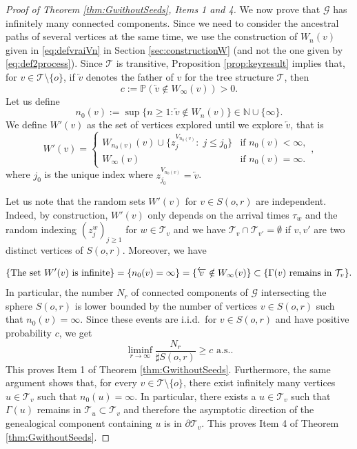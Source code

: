 \documentclass[french]{article}
\newcommand{\zi}{z}
\newcommand{\N}{\mathbb{N}}
\renewcommand{\P}{\mathbb{P}}
\newcommand{\T}{\mathcal{T}}
\renewcommand{\1}{\mathds{1}}
\begin{document}
\begin{proof}[Proof of Theorem \ref{thm:GwithoutSeeds}, Items 1 and 4]
We now prove that $\mathcal{G}$ has infinitely many connected components. Since we need to consider the ancestral paths of several vertices at the same time, we use the construction of $W_n(v)$ given in \eqref{eq:defvraiVn} in Section \ref{sec:constructionW} (and not the one given by \eqref{eq:def2process}). Since $\T$ is transitive, Proposition \ref{prop:keyresult} implies that, for $v \in \T \setminus \{o\}$, if $\overleftarrow{v}$ denotes the father of $v$ for the tree structure $\T$, then
$$c := \P(\overleftarrow{v}\notin W_\infty(v)) >0.$$
Let us define 
$$n_0(v) := \sup\{n\ge 1: \overleftarrow{v}\notin W_n(v)\} \in \N \cup \{\infty\}.$$
We define $W'(v)$ as the set of vertices explored until we explore $\overleftarrow{v}$, that is
\[
W'(v) =
\begin{cases}
W_{n_0(v)}(v)\cup\{\zi_{j}^{V_{n_0(v)}}:\; j\le j_0\} & \text{if } n_0(v)<\infty,\\
W_\infty(v) & \text{if } n_0(v)=\infty.
\end{cases},
\]
where $j_0$ is the unique index where $\zi_{j_0}^{V_{n_0(v)}} = \overleftarrow{v}$. 



Let us note that the random sets $W'(v)$ for $v\in S(o,r)$ are independent. Indeed, by construction, $W'(v)$ only depends on the arrival times $\tau_w$ and the random indexing $(\zi_j^w)_{j\ge 1}$ for $w \in \T_v$ and we have $\T_{v}\cap\T_{v'}=\emptyset$ if $v,v'$ are two distinct vertices of $S(o,r)$. Moreover, we have

$$\{\hbox{The set } W'(v) \hbox{ is infinite}\}=\{n_0(v)=\infty\}=\{\overleftarrow{v}\notin W_\infty(v)\}\subset \{\Gamma(v) \mbox{ remains in } \T_v\}.$$ 
In particular, the number $N_r$ of connected components of $\mathcal G$ intersecting the sphere $S(o,r)$ is lower bounded by the number of vertices $v\in S(o,r)$ such that $n_0(v)=\infty$. Since these events are i.i.d.\ for $v\in S(o,r)$ and have positive probability $c$, we get 
$$\liminf_{r\to \infty} \frac{N_r}{\sharp S(o,r)} \geq c \mbox{ a.s.}.$$
This proves Item 1 of Theorem \ref{thm:GwithoutSeeds}. Furthermore, the same argument shows that, for every $v\in \T \setminus \{o\}$, there exist infinitely many vertices $u \in \T_v$ such that $n_0(u)=\infty$. In particular, there exists a $u\in \T_v$ such that $\Gamma(u)$ remains in $\T_u\subset \T_v$ and therefore the asymptotic direction of the genealogical component containing $u$ is in $\partial \T_v$. This proves Item 4 of Theorem \ref{thm:GwithoutSeeds}. 
\end{proof} 
\end{document}
